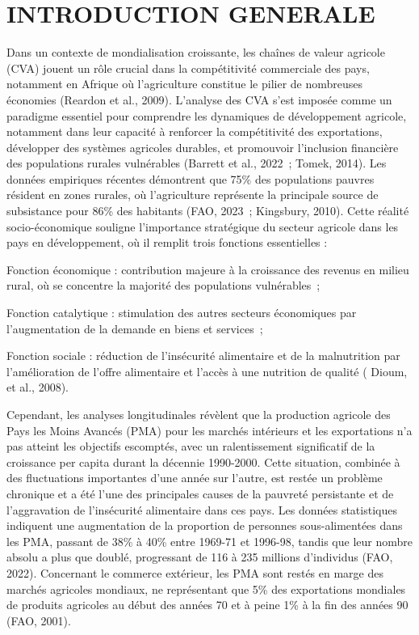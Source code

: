 \documentclass[12pt,oneside]{report}
\begin{document}
\chapter{INTRODUCTION GENERALE}
Dans un contexte de mondialisation croissante, les chaînes de valeur agricole (CVA) jouent un rôle crucial dans la compétitivité commerciale des pays, notamment en Afrique où l'agriculture constitue le pilier de nombreuses économies (Reardon et al., 2009). L'analyse des CVA s'est imposée comme un paradigme essentiel pour comprendre les dynamiques de développement agricole, notamment dans leur capacité à renforcer la compétitivité des exportations, développer des systèmes agricoles durables, et promouvoir l'inclusion financière des populations rurales vulnérables (Barrett et al., 2022 ; Tomek, 2014). Les données empiriques récentes démontrent que 75\% des populations pauvres résident en zones rurales, où l'agriculture représente la principale source de subsistance pour 86\% des habitants (FAO, 2023 ; Kingsbury, 2010). Cette réalité socio-économique souligne l'importance stratégique du secteur agricole dans les pays en développement, où il remplit trois fonctions essentielles :

Fonction économique : contribution majeure à la croissance des revenus en milieu rural, où se concentre la majorité des populations vulnérables ;

Fonction catalytique : stimulation des autres secteurs économiques par l'augmentation de la demande en biens et services ;

Fonction sociale : réduction de l'insécurité alimentaire et de la malnutrition par l'amélioration de l'offre alimentaire et l'accès à une nutrition de qualité ( Dioum, et al., 2008).

Cependant, les analyses longitudinales révèlent que la production agricole des Pays les Moins Avancés (PMA) pour les marchés intérieurs et les exportations n'a pas atteint les objectifs escomptés, avec un ralentissement significatif de la croissance per capita durant la décennie 1990-2000. Cette situation, combinée à des fluctuations importantes d'une année sur l'autre, est restée un problème chronique et a été l'une des principales causes de la pauvreté persistante et de l'aggravation de l’insécurité alimentaire dans ces pays. Les données statistiques indiquent une augmentation de la proportion de personnes sous-alimentées dans les PMA, passant de 38\% à 40\% entre 1969-71 et 1996-98, tandis que leur nombre absolu a plus que doublé, progressant de 116 à 235 millions d'individus (FAO, 2022). Concernant le commerce extérieur, les PMA sont restés en marge des marchés agricoles mondiaux, ne représentant que 5\% des exportations mondiales de produits agricoles au début des années 70 et à peine 1\% à la fin des années 90 (FAO, 2001).
\end{document}
